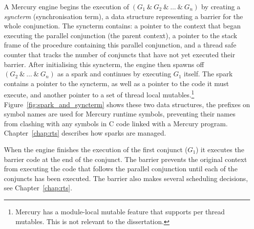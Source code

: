 A Mercury engine begins the execution of $(G_1~\&~G_2~\&~\ldots~\&~G_n)$
by creating a \emph{syncterm} (synchronisation term), a data structure
representing a barrier for the whole conjunction.
The syncterm contains:
a pointer to the context that began executing the parallel conjunction
(the parent context),
a pointer to the stack frame of the procedure containing this parallel
conjunction,
and a thread safe counter that tracks the number of conjuncts that have not
yet executed their barrier.
After initialising this syncterm, the engine then
spawns off $(G_2~\&~\ldots~\&~G_n)$ as a spark and continues by executing
$G_1$ itself.
The spark contains a pointer to the syncterm,
as well as a pointer to the code it must execute,
and another pointer to a set of thread local mutables.\footnote{
    Mercury has a module-local mutable feature that supports
    per thread mutables.
    This is not relevant to the dissertation.}
Figure~\ref{fig:spark_and_syncterm} shows these two data structures,
the  prefixes on symbol names are used for Mercury runtime
symbols,
preventing their names from clashing with any symbols in C code linked with
a Mercury program.
Chapter~\ref{chap:rts} describes how sparks are managed.

When the engine finishes the execution of the first conjunct ($G_1$)
it executes the barrier code \joinandcontinue at the end of the conjunct.
The barrier prevents the original context from executing the code that
follows the parallel conjunction
until each of the conjuncts has been executed.
The barrier also makes several scheduling decisions, see
Chapter~\ref{chap:rts}.

